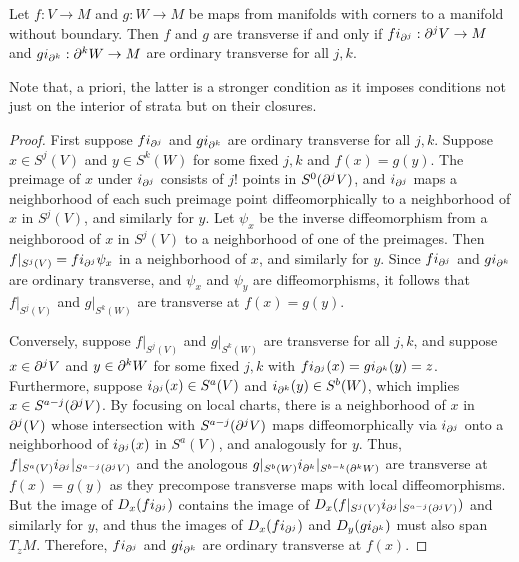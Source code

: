 \begin{lemma}\label{L: simple trans}
Let $f:V\to M$ and $g:W\to M$ be maps from manifolds with corners to a manifold without boundary. Then $f$ and $g$ are transverse if and only if $fi_{\partial^j}:\partial^jV\to M$ and  $gi_{\partial^k}:\partial^kW \to M$ are ordinary transverse for all $j,k$.
\end{lemma}
Note that, a priori, the latter is a stronger condition as it imposes conditions not just on the interior of strata but on their closures. 
\begin{proof}


First suppose $fi_{\partial^j }$ and  $gi_{\partial^k }$ are ordinary transverse for all $j,k$. Suppose $x\in S^j(V)$ and $y\in S^k(W)$ for some fixed $j,k$  and $f(x)=g(y)$. The preimage of $x$ under $i_{\partial^j}$ consists of $j!$ points in $S^0(\partial^jV)$, and $i_{\partial^j}$ maps a neighborhood of each such preimage point diffeomorphically to a neighborhood of $x$ in $S^j(V)$, and similarly for $y$. Let $\psi_x$ be the inverse diffeomorphism from a neighborood of $x$ in $S^j(V)$ to a neighborhood of one of the preimages. Then $f|_{S^j(V)}=fi_{\partial^j}\psi_x$ in a neighborhood of $x$, and similarly for $y$. 
Since $fi_{\partial^j }$ and  $gi_{\partial^k }$ are ordinary transverse, and $\psi_x$ and $\psi_y$ are diffeomorphisms, it follows that $f|_{S^j(V)}$ and $g|_{S^k(W)}$ are transverse at $f(x)=g(y)$.

Conversely, suppose $f|_{S^j(V)}$ and $g|_{S^k(W)}$ are transverse for all $j,k$, and suppose $x\in \partial^jV$ and $y\in \partial^kW$ for some fixed $j,k$ with $fi_{\partial^j}(x)=gi_{\partial^k}(y)=z$. Furthermore, suppose $i_{\partial^j}(x)\in S^a(V)$ and $i_{\partial^k}(y)\in S^b(W)$, which implies $x\in S^{a-j}(\partial^j V)$. By focusing on local charts, there is a neighborhood of $x$ in $\partial^j(V)$ whose intersection with $S^{a-j}(\partial^j V)$ maps  diffeomorphically via $i_{\partial^j}$ onto a neighborhood of $i_{\partial^j}(x)$ in $S^a(V)$, and analogously for $y$. Thus,  $f|_{S^a(V)}i_{\partial^j}|_{S^{a-j}(\partial^j V)}$ and the anologous $g|_{S^b(W)}i_{\partial^k}|_{S^{b-k}(\partial^k W)}$ are transverse at $f(x)=g(y)$ as they precompose transverse maps with local diffeomorphisms. But the image of $D_x(fi_{\partial^j})$ contains the image of $D_x(f|_{S^j(V)}i_{\partial^j}|_{S^{a-j}(\partial^j V)})$ and similarly for $y$, and thus the images of $D_x(fi_{\partial^j})$ and $D_y(gi_{\partial^k})$ must also span $T_{z}M$. Therefore, $fi_{\partial^j}$ and $gi_{\partial^k}$ are ordinary transverse at $f(x)$.
\end{proof}





